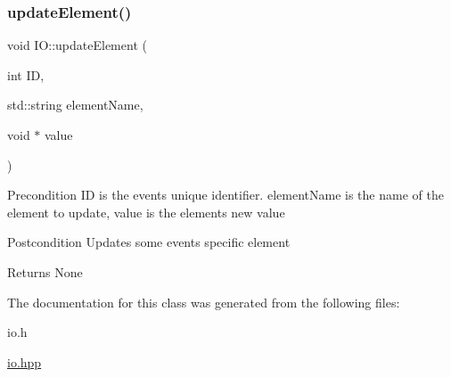 \subsubsection{\texorpdfstring{update\+Element()}{updateElement()}}
{\footnotesize\ttfamily void I\+O\+::update\+Element (\begin{DoxyParamCaption}\item[{int}]{ID,  }\item[{std\+::string}]{element\+Name,  }\item[{void $\ast$}]{value }\end{DoxyParamCaption})}

\begin{DoxyPrecond}{Precondition}
ID is the event\textquotesingle{}s unique identifier. element\+Name is the name of the element to update, value is the element\textquotesingle{}s new value 
\end{DoxyPrecond}
\begin{DoxyPostcond}{Postcondition}
Updates some event\textquotesingle{}s specific element 
\end{DoxyPostcond}
\begin{DoxyReturn}{Returns}
None 
\end{DoxyReturn}


The documentation for this class was generated from the following files\+:\begin{DoxyCompactItemize}
\item 
io.\+h\item 
\mbox{\hyperlink{io_8hpp}{io.\+hpp}}\end{DoxyCompactItemize}
